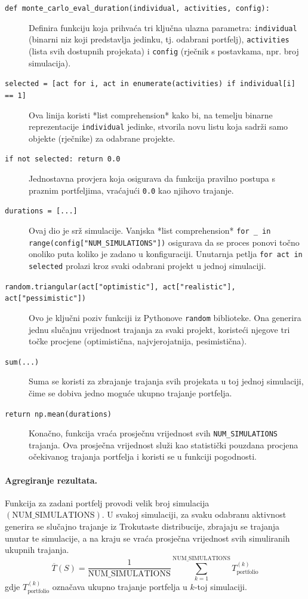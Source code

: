 \begin{description}
    \item[\texttt{def monte\_carlo\_eval\_duration(individual, activities, config):}] Definira funkciju koja prihvaća tri ključna ulazna parametra: \texttt{individual} (binarni niz koji predstavlja jedinku, tj. odabrani portfelj), \texttt{activities} (lista svih dostupnih projekata) i \texttt{config} (rječnik s postavkama, npr. broj simulacija).
    \item[\texttt{selected = [act for i, act in enumerate(activities) if individual[i] == 1]}] Ova linija koristi *list comprehension* kako bi, na temelju binarne reprezentacije \texttt{individual} jedinke, stvorila novu listu koja sadrži samo objekte (rječnike) za odabrane projekte.
    \item[\texttt{if not selected: return 0.0}] Jednostavna provjera koja osigurava da funkcija pravilno postupa s praznim portfeljima, vraćajući \texttt{0.0} kao njihovo trajanje.
    \item[\texttt{durations = [...]}] Ovaj dio je srž simulacije. Vanjska *list comprehension* \texttt{for \_ in range(config["NUM\_SIMULATIONS"])} osigurava da se proces ponovi točno onoliko puta koliko je zadano u konfiguraciji. Unutarnja petlja \texttt{for act in selected} prolazi kroz svaki odabrani projekt u jednoj simulaciji.
    \item[\texttt{random.triangular(act["optimistic"], act["realistic"], act["pessimistic"])}] Ovo je ključni poziv funkciji iz Pythonove \texttt{random} biblioteke. Ona generira jednu slučajnu vrijednost trajanja za svaki projekt, koristeći njegove tri točke procjene (optimistična, najvjerojatnija, pesimistična).
    \item[\texttt{sum(...)}] Suma se koristi za zbrajanje trajanja svih projekata u toj jednoj simulaciji, čime se dobiva jedno moguće ukupno trajanje portfelja.
    \item[\texttt{return np.mean(durations)}] Konačno, funkcija vraća prosječnu vrijednost svih \texttt{NUM\_SIMULATIONS} trajanja. Ova prosječna vrijednost služi kao statistički pouzdana procjena očekivanog trajanja portfelja i koristi se u funkciji pogodnosti.
\end{description}

\paragraph{Agregiranje rezultata.}
Funkcija za zadani portfelj provodi velik broj simulacija $(\text{NUM\_SIMULATIONS})$. U svakoj simulaciji, za svaku odabranu aktivnost generira se slučajno trajanje iz Trokutaste distribucije, zbrajaju se trajanja unutar te simulacije, a na kraju se vraća prosječna vrijednost svih simuliranih ukupnih trajanja.
\[
\overline{T}(S) = \frac{1}{\text{NUM\_SIMULATIONS}} \sum_{k=1}^{\text{NUM\_SIMULATIONS}} T_{\text{portfolio}}^{(k)}
\]
gdje $T_{\text{portfolio}}^{(k)}$ označava ukupno trajanje portfelja u $k$-toj simulaciji.


